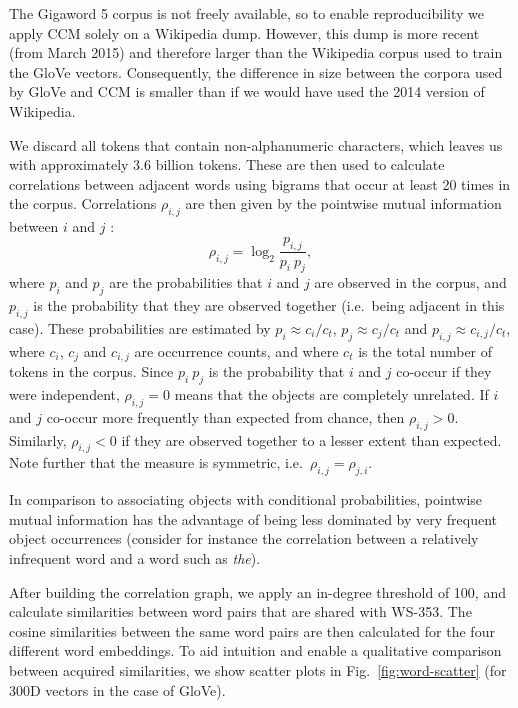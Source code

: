 \documentclass{kais}
\newcommand{\rn}[1]{\rho_{#1}}
\begin{document}
The Gigaword 5 corpus is not freely available, so to enable reproducibility we apply CCM solely on a Wikipedia dump. 
However, this dump is more recent (from March 2015) and therefore larger than the Wikipedia corpus used to train the GloVe vectors.
Consequently, the difference in size between the corpora used by GloVe and CCM is smaller than if we would have used the
2014 version of Wikipedia.

We discard all tokens that contain non-alphanumeric characters, which leaves us with approximately 3.6 billion 
tokens. These are then used to calculate correlations 
between adjacent words using bigrams that occur at least 20 times in the corpus. 
Correlations $\rn{i,j}$ are then given by the pointwise mutual information between $i$ and $j$ \cite{Church90}:
\begin{equation}
\rn{i,j} = \log_2 \frac{p_{i,j}}{p_i\ p_j},
\end{equation}
where $p_i$ and $p_j$ are the probabilities that $i$ and $j$ are observed in the corpus, and $p_{i,j}$ is the probability
that they are observed together (i.e.\ being adjacent in this case). 
These probabilities are estimated by $p_i \approx c_i / c_{t}$, $p_j \approx c_j / c_{t}$ and
$p_{i,j} \approx c_{i,j} / c_{t}$, where $c_i$, $c_j$ and $c_{i,j}$ are occurrence counts, and where $c_{t}$ is the total number
of tokens in the corpus. Since $p_i\ p_j$ is the probability that $i$ and $j$ co-occur if they were independent, 
$\rn{i,j} = 0$ means that the objects are completely unrelated. If 
$i$ and $j$ co-occur more frequently than expected from chance, then $\rn{i,j} > 0$. Similarly, $\rn{i,j} < 0$ if they 
are observed together to a lesser extent than expected. Note further that the measure is symmetric, i.e.~$\rn{i,j} = \rn{j,i}$.

In comparison to associating objects with conditional probabilities,
pointwise mutual information has the advantage of being less dominated by very frequent object occurrences (consider for
instance the correlation between a relatively infrequent word and a word such as \emph{the}).

After building the correlation graph, we apply an in-degree threshold of 100, and calculate similarities
between word pairs that are shared with WS-353. The cosine similarities between the same word pairs
are then calculated for the four different word embeddings. To aid intuition and enable a qualitative comparison 
between acquired similarities, we show scatter plots in Fig.\ \ref{fig:word-scatter} (for 300D vectors in the case of GloVe).
\end{document}
